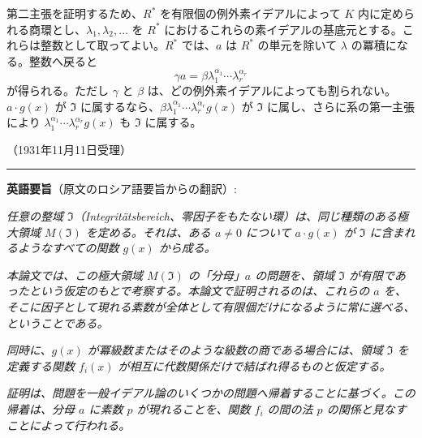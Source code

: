 第二主張を証明するため、$R^*$ を有限個の例外素イデアルによって $K$ 内に定められる商環とし、$\lambda_1,\lambda_2,\ldots$ を $R^*$ におけるこれらの素イデアルの基底元とする。これらは整数として取ってよい。$R^*$ では、$a$ は $R^*$ の単元を除いて $\lambda$ の冪積になる。整数へ戻ると
\[
\gamma a=\beta\lambda_1^{\alpha_1}\cdots\lambda_r^{\alpha_r}
\]
が得られる。ただし $\gamma$ と $\beta$ は、どの例外素イデアルによっても割られない。$a\cdot g(x)$ が $\mathfrak{I}$ に属するなら、$\beta\lambda_1^{\alpha_1}\cdots\lambda_r^{\alpha_r}g(x)$ が $\mathfrak{I}$ に属し、さらに系の第一主張により $\lambda_1^{\alpha_1}\cdots\lambda_r^{\alpha_r}g(x)$ も $\mathfrak{I}$ に属する。

\begin{center}
（1931年11月11日受理）
\end{center}

\bigskip
\noindent\rule{\textwidth}{0.4pt}
\medskip
\noindent\textbf{英語要旨}（原文のロシア語要旨からの翻訳）:

\smallskip
\emph{任意の整域 $\mathfrak{I}$（Integritätsbereich、零因子をもたない環）は、同じ種類のある極大領域 $M(\mathfrak{I})$ を定める。それは、ある $a\ne0$ について $a\cdot g(x)$ が $\mathfrak{I}$ に含まれるようなすべての関数 $g(x)$ から成る。}

\emph{本論文では、この極大領域 $M(\mathfrak{I})$ の「分母」$a$ の問題を、領域 $\mathfrak{I}$ が有限であったという仮定のもとで考察する。本論文で証明されるのは、これらの $a$ を、そこに因子として現れる素数が全体として有限個だけになるように常に選べる、ということである。}

\emph{同時に、$g(x)$ が冪級数またはそのような級数の商である場合には、領域 $\mathfrak{I}$ を定義する関数 $f_i(x)$ が相互に代数関係だけで結ばれ得るものと仮定する。}

\emph{証明は、問題を一般イデアル論のいくつかの問題へ帰着することに基づく。この帰着は、分母 $a$ に素数 $p$ が現れることを、関数 $f_i$ の間の法 $p$ の関係と見なすことによって行われる。}
